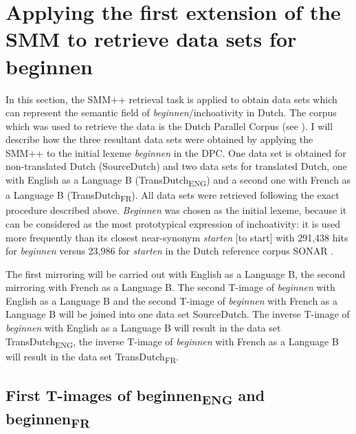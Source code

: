 \section{Applying the first extension of the SMM to retrieve data sets for beginnen}
\label{sec:3.6}
In this section, the SMM++ retrieval task is applied to obtain data sets which can represent the semantic field of \textit{beginnen}/inchoativity in Dutch. The corpus which was used to retrieve the data is the Dutch Parallel Corpus (see ). I will describe how the three resultant data sets were obtained by applying the SMM++ to the initial lexeme \textit{beginnen} in the DPC. One data set is obtained for non-translated Dutch (SourceDutch) and two data sets for translated Dutch, one with English as a Language B (TransDutch\textsubscript{ENG}) and a second one with French as a Language B (TransDutch\textsubscript{FR}). All data sets were retrieved following the exact procedure described above. \textit{Beginnen} was chosen as the initial lexeme, because it can be considered as the most prototypical expression of inchoativity: it is used more frequently than its closest near-synonym \textit{starten} [to start] with 291,438 hits for \textit{beginnen} versus 23,986 for \textit{starten} in the Dutch reference corpus SONAR \citep{spyns_construction_2013}.

The first mirroring will be carried out with English as a Language B, the second mirroring with French as a Language B. The second T-image of \textit{beginnen} with English as a Language B and the second T-image of \textit{beginnen} with French as a Language B will be joined into one data set SourceDutch. The inverse T-image of \textit{beginnen} with English as a Language B will result in the data set TransDutch\textsubscript{ENG}, the inverse T-image of \textit{beginnen} with French as a Language B will result in the data set TransDutch\textsubscript{FR}.

\subsection{ First T-images of beginnen\textsubscript{ENG}\textsubscript{} and beginnen\textsubscript{FR}}\footnotemark{}\label{sec:3.6.1} 

